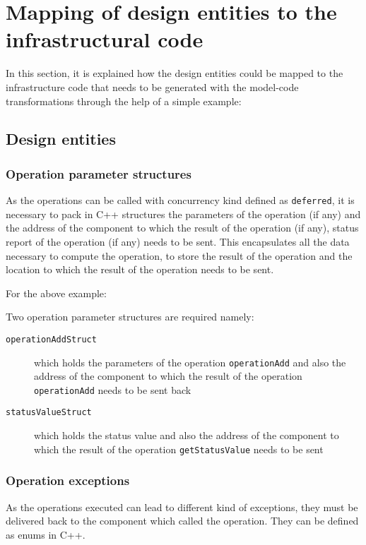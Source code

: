 \section{Mapping of design entities to the infrastructural code}    
In this section, it is explained how the design entities could be mapped to the infrastructure code that needs to be generated with the model-code transformations through the help of a simple example:

\subsection{Design entities}

\subsubsection{Operation parameter structures}
As the operations can be called with concurrency kind defined as \texttt{deferred}, it is necessary to pack in C++ structures the parameters of the operation (if any) and the address of the component to which the result of the operation (if any), status report of the operation (if any) needs to be sent. This encapsulates all the data necessary to compute the operation, to store the result of the operation and the location to which the result of the operation needs to be sent.  

For the above example:

Two operation parameter structures are required namely:
\begin{description}
\item [\texttt{operationAddStruct}] which holds the parameters of the operation \texttt{operationAdd} and also the address of the component to which the result of the operation \texttt{operationAdd} needs to be sent back
\item [\texttt{statusValueStruct}] which holds the status value and also the address of the component to which the result of the operation \texttt{getStatusValue} needs to be sent
\end{description}

\subsubsection{Operation exceptions}
As the operations executed can lead to different kind of exceptions, they must be delivered back to the component which called the operation. They can be defined as enums in C++.

